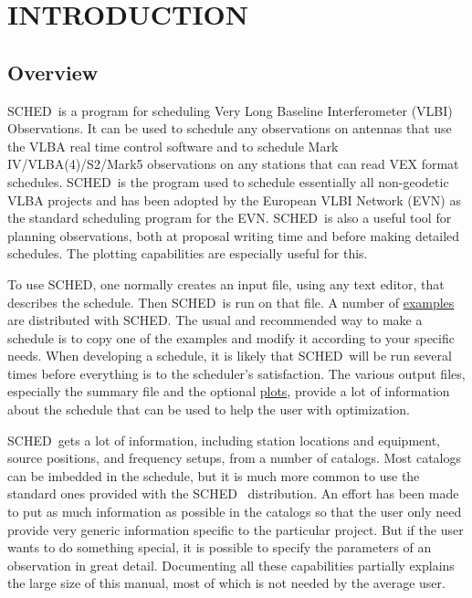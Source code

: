 \documentclass{report}
\newcommand{\sched}{{\sc SCHED}}
\newcommand{\schedb}{{\sc SCHED~}}
\begin{document}
\newpage

\chapter{\label{CHP:INTRO}INTRODUCTION}

\section{\label{SEC:INTRO}Overview}

\schedb is a program for scheduling Very Long Baseline Interferometer
(VLBI) Observations.  It can be used to schedule any observations on
antennas that use the VLBA real time control software and to schedule
Mark IV/VLBA(4)/S2/Mark5 observations on any stations that can read
VEX format schedules.  \schedb is the program used to schedule
essentially all non-geodetic VLBA projects and has been adopted by the
European VLBI Network (EVN) as the standard scheduling program for the
EVN.  \schedb is also a useful tool for planning observations, both at
proposal writing time and before making detailed schedules.  The
plotting capabilities are especially useful for this.

To use \sched, one normally creates an input file, using any text
editor, that describes the schedule.  Then \schedb is run on that
file.  A number of 
{\hyperref[SEC:EXAMPLES]{examples}} are distributed
with \sched.  The usual and recommended way to make a schedule is to
copy one of the examples and modify it according to your specific
needs.  When developing a schedule, it is likely that \schedb will be
run several times before everything is to the scheduler's
satisfaction.  The various output files, especially the summary file
and the optional 
{\hyperref[SEC:PLOT]{plots}}, provide a lot of
information about the schedule that can be used to help the user with
optimization.

\schedb gets a lot of information, including station locations and
equipment, source positions, and frequency setups, from a number of
catalogs.  Most catalogs can be imbedded in the schedule, but it is
much more common to use the standard ones provided with the \schedb
distribution.  An effort has been made to put as much information as
possible in the catalogs so that the user only need provide very
generic information specific to the particular project.  But if the
user wants to do something special, it is possible to specify the
parameters of an observation in great detail.  Documenting all these
capabilities partially explains the large size of this manual, most
of which is not needed by the average user.
\end{document}
